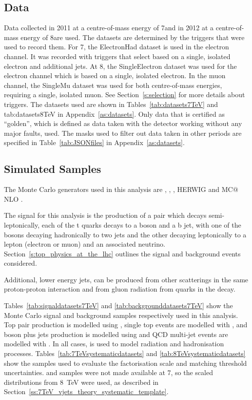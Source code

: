 \subsection{Data}
\label{ss:data}

Data collected in 2011 at a centre-of-mass energy of 7\TeV and in 2012 at a centre-of-mass energy of
8\TeV are used. The datasets are determined by the triggers that were used to record them. For 7\TeV, the ElectronHad
dataset is used in the electron channel. It was recorded with triggers that select based on a single, isolated
electron and additional jets. At 8\TeV, the SingleElectron dataset was used for the electron channel
which is based on a single, isolated electron. In the muon channel, the SingleMu dataset was used for both
centre-of-mass energies, requiring a single, isolated muon. See Section~\ref{s:selection} for more
details about triggers. The datasets used are shown in Tables~\ref{tab:datasets7TeV} and {tab:datasets8TeV} in
Appendix~\ref{as:datasets}. Only data that is certified as “golden”, which is defined as data taken with the
detector working without any major faults, used. The masks used to filter out data taken in other periods are
specified in Table~\ref{tab:JSONfiles} in Appendix~\ref{as:datasets}.

\subsection{Simulated Samples}
\label{ss:simulated_samples}
The Monte Carlo generators used in this analysis are \MADGRAPH \cite{madgraph5}, \PYTHIA \cite{pythia8},
\POWHEG \cite{powheg_Nason,powheg_Frixione,powheg_Alioli}, HERWIG \cite{herwig} and MC$@$NLO
\cite{mcatnlo_Frixione1, mcatnlo_Frixione2}.

The signal for this analysis is the production of a \ttbar pair which decays semi-leptonically, \ie each of
the t quarks decays to a \W boson and a b jet, with one of the \W bosons decaying hadronically to two jets and
the other decaying leptonically to a lepton (electron or muon) and an associated neutrino.
Section~\ref{s:top_physics_at_the_lhc} outlines the signal and background events considered.

Additional, lower energy jets, can be produced from other scatterings in the same proton-proton interaction
and from gluon radiation from quarks in the decay. 

Tables~\ref{tab:signaldatasets7TeV} and \ref{tab:backgrounddatasets7TeV} show the Monte Carlo signal and
background samples respectively used in this analysis. Top pair production is modelled using \MADGRAPH, single
top events are modelled with \POWHEG, \W and \Z boson plus jets production is modelled using \MADGRAPH and QCD
multi-jet events are modelled with \PYTHIA. In all cases, \PYTHIA is used to model radiation and hadronisation
processes. Tables~\ref{tab:7TeVsystematicdatasets} and \ref{tab:8TeVsystematicdatasets} show the samples used
to evaluate the factorisation scale and matching threshold uncertainties. \WpJets and \ZpJets samples were not
made available at 7\TeV, so the scaled distributions from \SI{8}{\TeV} were used, as described in
Section~\ref{ss:7TeV_vjets_theory_systematic_template}.


